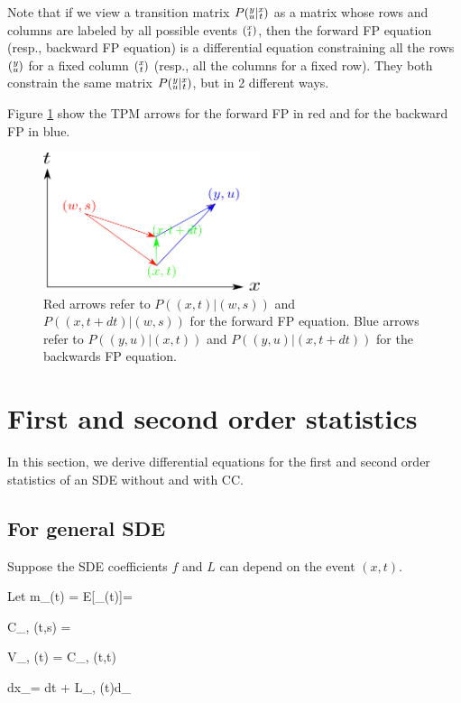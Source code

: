 Note that if we view
a transition matrix 
$P({\substack{y\\u}}|{\substack{x\\t}})$  as a matrix whose rows and columns are labeled by 
all possible events $({\substack{x\\t}})$, then the forward FP equation (resp., backward FP equation)
is a differential equation
constraining all the rows $({\substack{y\\u}})$ for a fixed column
$({\substack{x\\t}})$
(resp., all the columns for a fixed row).
They both constrain
the same matrix $P({\substack{y\\u}}|{\substack{x\\t}})$,
but in 2 different ways.

Figure \ref{fig-fokker-planck}
show the TPM arrows for the
forward FP 
in red and for the
backward FP in blue.


\begin{figure}[h!]
\centering
\includegraphics[width=2.5in]
{stochastic-diff-eqns/fokker-planck.png}
\caption{Red arrows refer to 
$P((x,t)|(w,s))$
and $P((x,t+dt)|(w,s))$
for the forward FP equation.
Blue arrows refer to
$P((y,u)|(x,t))$
and
$P((y,u)|(x,t+dt))$
for the backwards FP equation.
}
\label{fig-fokker-planck}
\end{figure}







\section{First and second order statistics}
In this section,
we derive differential equations
for the  first and second order statistics
of an SDE without and with CC.
\subsection{For general SDE}
Suppose the SDE coefficients $f$ and $L$
can depend on the event $(x,t)$.


Let
\beq
m_\mu(t) = E[\rvx_\mu(t)]=
\eeq

\beq
C_{\mu, \nu}(t,s) = 
\eeq

\beq
V_{\mu, \nu}(t) = C_{\mu, \nu}(t,t)
\eeq


\beq
dx_\mu = \left[a_\mu(t) + F_{\mu, \nu}(t)x_\nu \right] dt + 
L_{\mu, \nu}(t)d\rvB_\nu
\eeq

